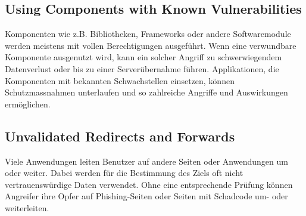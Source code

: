 \subsection{Using Components with Known Vulnerabilities}
Komponenten wie z.B. Bibliotheken, Frameworks oder andere Softwaremodule werden meistens mit vollen Berechtigungen ausgeführt. Wenn eine verwundbare Komponente ausgenutzt wird, kann ein solcher Angriff zu schwerwiegendem Datenverlust oder bis zu einer Serverübernahme führen. Applikationen, die Komponenten mit bekannten Schwachstellen einsetzen, können Schutzmassnahmen unterlaufen und so zahlreiche Angriffe und Auswirkungen ermöglichen.

\subsection{Unvalidated Redirects and Forwards}
Viele Anwendungen leiten Benutzer auf andere Seiten oder Anwendungen um oder weiter. Dabei werden für die Bestimmung des Ziels oft nicht vertrauenswürdige Daten verwendet. Ohne eine entsprechende Prüfung können Angreifer ihre Opfer auf Phishing-Seiten oder Seiten mit Schadcode um- oder weiterleiten.